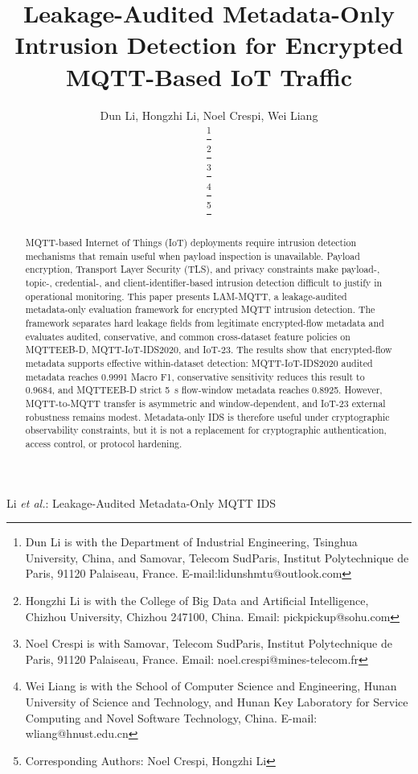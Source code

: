 \documentclass[lettersize,journal]{IEEEtran}
\begin{document}
\title{Leakage-Audited Metadata-Only Intrusion Detection for Encrypted MQTT-Based IoT Traffic}

\author{
Dun Li\orcidA{},
Hongzhi Li\orcidH{},
Noel Crespi\orcidN{},
Wei Liang\orcidW{}

\thanks{
Dun Li is with the Department of Industrial Engineering, Tsinghua University, China, and Samovar, Telecom SudParis, Institut Polytechnique de Paris, 91120 Palaiseau, France. E-mail:lidunshmtu@outlook.com
}

\thanks{
Hongzhi Li is with the College of Big Data and Artificial Intelligence, Chizhou University, Chizhou 247100, China. Email: pickpickup@sohu.com
}

\thanks{
Noel Crespi is with Samovar, Telecom SudParis, Institut Polytechnique de Paris, 91120 Palaiseau, France. Email: noel.crespi@mines-telecom.fr
}

\thanks{
Wei Liang is with the School of Computer Science and Engineering, Hunan University of Science and Technology, and Hunan Key Laboratory for Service Computing and Novel Software Technology, China. E-mail: wliang@hnust.edu.cn
}

\thanks{
Corresponding Authors: Noel Crespi, Hongzhi Li}
}

%
{Li \MakeLowercase{\textit{et al.}}: Leakage-Audited Metadata-Only MQTT IDS}

\maketitle

\begin{abstract}
MQTT-based Internet of Things (IoT) deployments require intrusion detection mechanisms that remain useful when payload inspection is unavailable. Payload encryption, Transport Layer Security (TLS), and privacy constraints make payload-, topic-, credential-, and client-identifier-based intrusion detection difficult to justify in operational monitoring. This paper presents LAM-MQTT, a leakage-audited metadata-only evaluation framework for encrypted MQTT intrusion detection. The framework separates hard leakage fields from legitimate encrypted-flow metadata and evaluates audited, conservative, and common cross-dataset feature policies on MQTTEEB-D, MQTT-IoT-IDS2020, and IoT-23. The results show that encrypted-flow metadata supports effective within-dataset detection: MQTT-IoT-IDS2020 audited metadata reaches 0.9991 Macro F1, conservative sensitivity reduces this result to 0.9684, and MQTTEEB-D strict 5~s flow-window metadata reaches 0.8925. However, MQTT-to-MQTT transfer is asymmetric and window-dependent, and IoT-23 external robustness remains modest. Metadata-only IDS is therefore useful under cryptographic observability constraints, but it is not a replacement for cryptographic authentication, access control, or protocol hardening.
\end{abstract}
\end{document}

